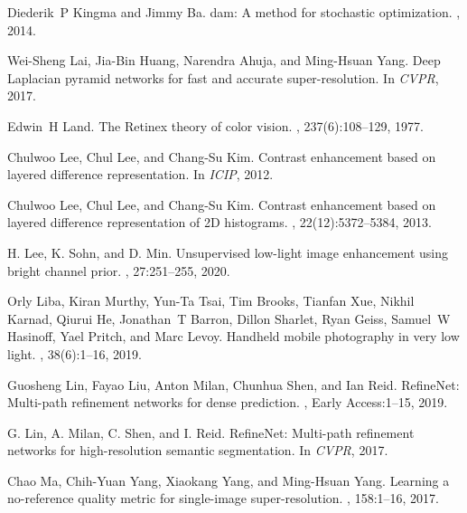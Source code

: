 \documentclass[final]{cvpr}
\begin{document}
{\begin{thebibliography}{10}
Diederik~P Kingma and Jimmy Ba.
dam: {A} method for stochastic optimization.
, 2014.

Wei-Sheng Lai, Jia-Bin Huang, Narendra Ahuja, and Ming-Hsuan Yang.
\newblock Deep {L}aplacian pyramid networks for fast and accurate
  super-resolution.
\newblock In {\em CVPR}, 2017.

Edwin~H Land.
\newblock The {R}etinex theory of color vision.
, 237(6):108--129, 1977.

Chulwoo Lee, Chul Lee, and Chang-Su Kim.
\newblock Contrast enhancement based on layered difference representation.
\newblock In {\em ICIP}, 2012.

Chulwoo Lee, Chul Lee, and Chang-Su Kim.
\newblock Contrast enhancement based on layered difference representation of
  2{D} histograms.
, 22(12):5372--5384, 2013.

H. {Lee}, K. {Sohn}, and D. {Min}.
\newblock Unsupervised low-light image enhancement using bright channel prior.
, 27:251--255, 2020.

Orly Liba, Kiran Murthy, Yun-Ta Tsai, Tim Brooks, Tianfan Xue, Nikhil Karnad,
  Qiurui He, Jonathan~T Barron, Dillon Sharlet, Ryan Geiss, Samuel~W Hasinoff,
  Yael Pritch, and Marc Levoy.
\newblock Handheld mobile photography in very low light.
, 38(6):1--16, 2019.

Guosheng Lin, Fayao Liu, Anton Milan, Chunhua Shen, and Ian Reid.
\newblock Refine{N}et: {M}ulti-path refinement networks for dense prediction.
,
  Early Access:1--15, 2019.

G. Lin, A. Milan, C. Shen, and I. Reid.
\newblock Refine{N}et: {M}ulti-path refinement networks for high-resolution
  semantic segmentation.
\newblock In {\em CVPR}, 2017.

Chao Ma, Chih-Yuan Yang, Xiaokang Yang, and Ming-Hsuan Yang.
\newblock Learning a no-reference quality metric for single-image
  super-resolution.
, 158:1--16, 2017.


\end{thebibliography}}
\end{document}
